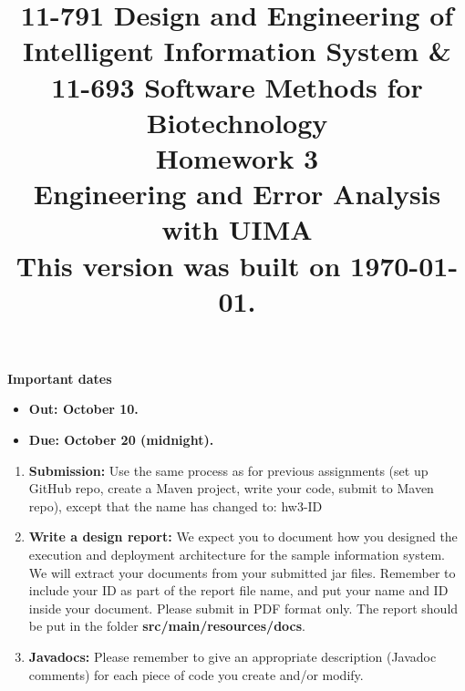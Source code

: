 \documentclass[oneside]{memoir}
\title{{\bfseries 11-791 Design and Engineering of Intelligent Information
System \& \\11-693 Software Methods for Biotechnology \\Homework 3}\\
\vspace{1em}
Engineering and Error Analysis with UIMA
\\
{\small This version was built on \today.}
}
\date{}
\begin{document}
\maketitle

\hspace{-0.1\textwidth}
\begin{minipage}{1.2\textwidth}
\vspace{-5em}
\textbf{Important dates}
\begin{itemize}

\item \textbf{Out: October 10.} 

\item \textbf{Due: October 20 (midnight).} 

%

\end{itemize}

\end{minipage}

\begin{enumerate}

\item \textbf{Submission:} 
Use the same process as for previous assignments (set up GitHub repo, create a Maven 
project, write your code, submit to Maven repo), except that the name has changed to:
hw3-ID

\item \textbf{Write a design report:}
We expect you to document how you designed the execution and
deployment architecture for the sample information system. 
We will extract your documents from your
submitted jar files. 
Remember to include your ID as part of the report file name, and put your name and
ID inside your document. Please submit in PDF format only.
The report should be put in the folder \textbf{src/main/resources/docs}.


\item \textbf{Javadocs:} 
Please remember to give an appropriate description (Javadoc comments) for each 
piece of code you create and/or modify.

\end{enumerate}
\end{document}
